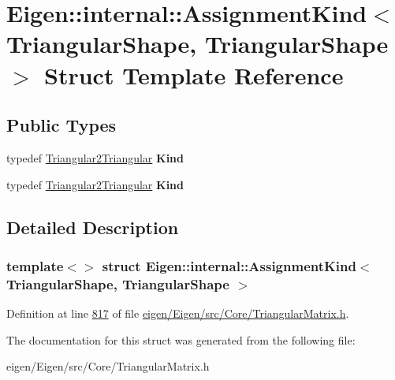 \hypertarget{struct_eigen_1_1internal_1_1_assignment_kind_3_01_triangular_shape_00_01_triangular_shape_01_4}{}\section{Eigen\+:\+:internal\+:\+:Assignment\+Kind$<$ Triangular\+Shape, Triangular\+Shape $>$ Struct Template Reference}
\label{struct_eigen_1_1internal_1_1_assignment_kind_3_01_triangular_shape_00_01_triangular_shape_01_4}
\subsection*{Public Types}
\begin{DoxyCompactItemize}
\item 
\mbox{\label{struct_eigen_1_1internal_1_1_assignment_kind_3_01_triangular_shape_00_01_triangular_shape_01_4_a0c36b9f7d2866f7532ada40d628c313e}} 
typedef \hyperlink{struct_eigen_1_1internal_1_1_triangular2_triangular}{Triangular2\+Triangular} {\bfseries Kind}
\item 
\mbox{\label{struct_eigen_1_1internal_1_1_assignment_kind_3_01_triangular_shape_00_01_triangular_shape_01_4_a0c36b9f7d2866f7532ada40d628c313e}} 
typedef \hyperlink{struct_eigen_1_1internal_1_1_triangular2_triangular}{Triangular2\+Triangular} {\bfseries Kind}
\end{DoxyCompactItemize}


\subsection{Detailed Description}
\subsubsection*{template$<$$>$\newline
struct Eigen\+::internal\+::\+Assignment\+Kind$<$ Triangular\+Shape, Triangular\+Shape $>$}



Definition at line \hyperlink{eigen_2_eigen_2src_2_core_2_triangular_matrix_8h_source_l00817}{817} of file \hyperlink{eigen_2_eigen_2src_2_core_2_triangular_matrix_8h_source}{eigen/\+Eigen/src/\+Core/\+Triangular\+Matrix.\+h}.



The documentation for this struct was generated from the following file\+:\begin{DoxyCompactItemize}
\item 
eigen/\+Eigen/src/\+Core/\+Triangular\+Matrix.\+h\end{DoxyCompactItemize}

